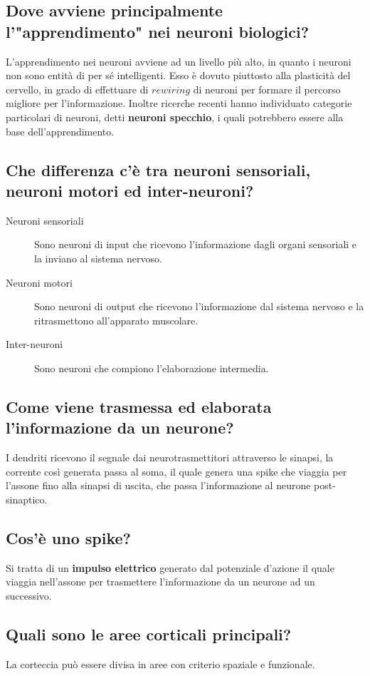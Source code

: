 \documentclass[\main/main.tex]{subfiles}
\begin{document}
\subsection{Dove avviene principalmente l'"apprendimento" nei neuroni biologici?}
L'apprendimento nei neuroni avviene ad un livello più alto, in quanto i neuroni non sono entità di per sé intelligenti. Esso è dovuto piuttosto alla plasticità del cervello, in grado di effettuare di $rewiring$ di neuroni per formare il percorso migliore per l'informazione. Inoltre ricerche recenti hanno individuato categorie particolari di neuroni, detti \textbf{neuroni specchio}, i quali potrebbero essere alla base dell'apprendimento.

\subsection{Che differenza c'è tra neuroni sensoriali, neuroni motori ed inter-neuroni?}
\begin{description}
  \item[Neuroni sensoriali] Sono neuroni di input che ricevono l'informazione dagli organi sensoriali e la inviano al sistema nervoso.
  \item[Neuroni motori] Sono neuroni di output che ricevono l'informazione dal sistema nervoso e la ritrasmettono all'apparato muscolare.
  \item[Inter-neuroni] Sono neuroni che compiono l'elaborazione intermedia.
\end{description}

\subsection{Come viene trasmessa ed elaborata l'informazione da un neurone?}
I dendriti ricevono il segnale dai neurotrasmettitori attraverso le sinapsi, la corrente così generata passa al soma, il quale genera una spike che viaggia per l'assone fino alla sinapsi di uscita, che passa l'informazione al neurone post-sinaptico.

\subsection{Cos'è uno spike?}
Si tratta di un \textbf{impulso elettrico} generato dal potenziale d'azione il quale viaggia nell'assone per trasmettere l'informazione da un neurone ad un successivo.

\subsection{Quali sono le aree corticali principali?}
La corteccia può essere divisa in aree con criterio spaziale e funzionale.
\end{document}
